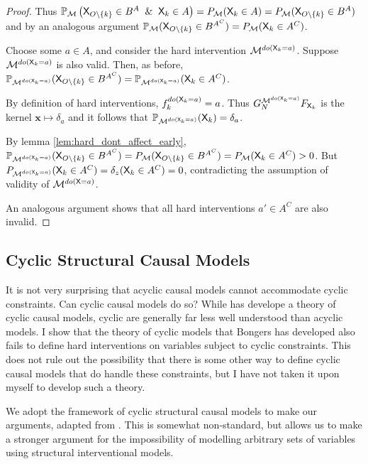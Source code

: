 \begin{proof}
Thus $\mathbb{P}_{\mathcal{M}}\left(\RV{X}_{O\setminus\{k\}}\in B^A \And \RV{X}_k\in A\right)=P_{\mathcal{M}} (\RV{X}_k\in A)=P_{\mathcal{M}}(\RV{X}_{O\setminus\{k\}}\in B^A)$ and by an analogous argument $\mathbb{P}_{\mathcal{M}}(\mathsf{X}_{O\setminus\{k\}}\in B^{A^C})=P_{\mathcal{M}} (\mathsf{X}_k\in A^C)$.

Choose some $a\in A$, and consider the hard intervention $\mathcal{M}^{do(\mathsf{X}_k=a)}$. Suppose $\mathcal{M}^{do(\mathsf{X}_k=a)}$ is also valid. Then, as before, $\mathbb{P}_{\mathcal{M}^{do(\mathsf{X}_k=a)}}(\mathsf{X}_{O\setminus\{k\}}\in B^{A^C})=\mathbb{P}_{\mathcal{M}^{do(\mathsf{X}_k=a)}}(\mathsf{X}_k\in A^C)$.

By definition of hard interventions, $f_k^{do(\mathsf{X}_k=a)} = a$. Thus $G^{\mathcal{M}^{do(\mathsf{X}_k=a)}}_N F_{\mathsf{X}_k}$ is the kernel $\mathbf{x}\mapsto \delta_a$ and it follows that $\mathbb{P}_{\mathcal{M}^{do(\mathsf{X}_k=a)}}(\mathsf{X}_k) = \delta_a$. 

By lemma \ref{lem:hard_dont_affect_early}, $\mathbb{P}_{\mathcal{M}^{do(\mathsf{X}_k=a)}}(\mathsf{X}_{O\setminus\{k\}}\in B^{A^C})=P_{\mathcal{M}}(\mathsf{X}_{O\setminus\{k\}}\in B^{A^C}) = P_{\mathcal{M}}(\mathsf{X}_k\in A^C)>0$. But $P_{\mathcal{M}^{do(\mathsf{X}_k=a)}}(\mathsf{X}_k \in {A^C})=\delta_z(\mathsf{X}_k\in A^C)=0$, contradicting the assumption of validity of $\mathcal{M}^{do(\mathsf{X}=a)}$.

An analogous argument shows that all hard interventions $a'\in A^C$ are also invalid.
\end{proof}

\subsection{Cyclic Structural Causal Models}

It is not very surprising that acyclic causal models cannot accommodate cyclic constraints. Can cyclic causal models do so? While \citet{bongers_theoretical_2016} has develope a theory of cyclic causal models, cyclic are generally far less well understood than acyclic models. I show that the theory of cyclic models that Bongers has developed also fails to define hard interventions on variables subject to cyclic constraints. This does not rule out the possibility that there is some other way to define cyclic causal models that do handle these constraints, but I have not taken it upon myself to develop such a theory.


We adopt the framework of cyclic structural causal models to make our arguments, adapted from \citet{bongers_theoretical_2016}. This is somewhat non-standard, but allows us to make a stronger argument for the impossibility of modelling arbitrary sets of variables using structural interventional models.

